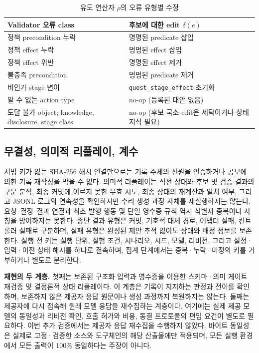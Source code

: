 \documentclass[journal]{IEEEtran}
\begin{document}
\begin{table}[!tbp]
\caption{유도 연산자 $\rho$의 오류 유형별 수정}
\label{tab:rho-rules}
\centering
\footnotesize
\begin{tabularx}{\columnwidth}{@{}>{\raggedright\arraybackslash}X>{\raggedright\arraybackslash}X@{}}
\toprule
\textbf{Validator 오류 class} & \textbf{후보에 대한 edit $\delta(e)$} \\
\midrule
정책 precondition 누락 & 명명된 predicate 삽입 \\
정책 effect 누락 & 명명된 effect 삽입 \\
정책 effect 위반 & 명명된 effect 제거 \\
불충족 precondition & 명명된 predicate 제거 \\
비인가 stage 변이 & \texttt{quest\_stage\_effect} 초기화 \\
알 수 없는 action type & no-op (등록된 대안 없음) \\
도달 불가 object; knowledge, disclosure, stage class & no-op (후보 국소 edit은 세탁이거나 상태 지식 필요) \\
\bottomrule
\end{tabularx}
\end{table}

\subsection{무결성, 의미적 리플레이, 계수}\label{sec:audit}
서명 키가 없는 SHA-256 해시 연결만으로는 기록 주체의 신원을 인증하거나 공모에 의한 기록 재작성을 막을 수 없다. 의미적 리플레이는 직전 상태와 후보 및 검증 결과의 구문 분석, 최종 커밋에 이르지 못한 무효 시도, 최종 상태의 재계산과 일치 여부, 그리고 JSONL 로그의 연속성을 확인하지만 수리 생성 과정 자체를 재실행하지는 않는다. 요청--결정--결과 연결과 최초 발행 행동 및 단일 영수증 규칙 역시 식별자 중복이나 사칭을 방어하지는 못한다. 종단 결과 유형은 커밋, 기호적 대체 경로, 어댑터 실패, 컨트롤러 실패로 구분하며, 실패 유형은 완성된 제안 추적 없이도 상태와 배정 정보를 보존한다. 실행 전 키는 실행 단위, 실험 조건, 시나리오, 시드, 모델, 리비전, 그리고 설정·입력·이전 상태 해시를 하나로 결속하며, 집계 단계에서는 중복·누락·미정의 키를 거부하거나 별도로 분리한다.

\noindent\textbf{재현의 두 계층.} 첫째는 보존된 구조화 입력과 영수증을 이용한 스키마·의미 게이트 재검증 및 결정론적 상태 리플레이다. 이 계층은 기록이 지지하는 판정과 전이를 확인하며, 보존하지 않은 제공자 응답 원문이나 생성 과정까지 복원하지는 않는다. 둘째는 제공자에 다시 접속해 원래 모델 응답을 재수집하는 계층이다. 여기에는 실제 제공 모델의 동일성과 리비전 확인, 호출 허가와 비용, 동결 프로토콜의 편입 요건이 별도로 필요하다. 이번 추가 검증에서는 제공자 응답 재수집을 수행하지 않았다. 바이트 동일성은 실제로 고정·검증한 소스와 도구체인의 해당 산출물에만 적용되며, 모든 실행 환경에서 모든 출력이 100\% 동일하다는 주장이 아니다.
\end{document}
